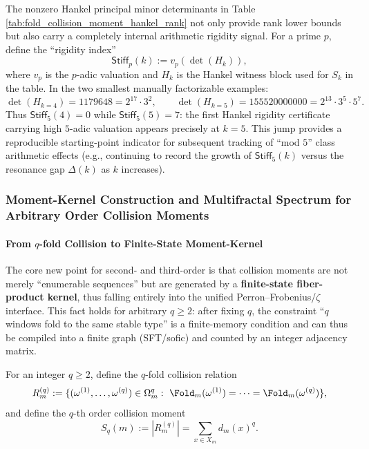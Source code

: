 \begin{remark}[\texorpdfstring{$p$}{p}-adic Rigidity Fingerprint: \texorpdfstring{$p=5$}{p=5} First Appears Explicitly in the Hankel Certificate at \texorpdfstring{$k=5$}{k=5}]\label{rem:pom-hankel-stiffness-p5}
The nonzero Hankel principal minor determinants in Table \ref{tab:fold_collision_moment_hankel_rank} not only provide rank lower bounds but also carry a completely internal arithmetic rigidity signal.
For a prime \(p\), define the ``rigidity index''
\[
\mathsf{Stiff}_p(k):=v_p(\det(H_k)),
\]
where \(v_p\) is the \(p\)-adic valuation and \(H_k\) is the Hankel witness block used for \(S_k\) in the table.
In the two smallest manually factorizable examples:
\[
\det(H_{k=4})=1179648=2^{17}\cdot 3^2,
\qquad
\det(H_{k=5})=155520000000=2^{13}\cdot 3^5\cdot 5^7.
\]
Thus \(\mathsf{Stiff}_5(4)=0\) while \(\mathsf{Stiff}_5(5)=7\): the first Hankel rigidity certificate carrying high \(5\)-adic valuation appears precisely at \(k=5\).
This jump provides a reproducible starting-point indicator for subsequent tracking of ``mod \(5\)'' class arithmetic effects (e.g., continuing to record the growth of \(\mathsf{Stiff}_5(k)\) versus the resonance gap \(\Delta(k)\) as \(k\) increases).
\end{remark}

\subsubsection{Moment-Kernel Construction and Multifractal Spectrum for Arbitrary Order Collision Moments}\label{subsec:pom-moment-general}

\paragraph{From \texorpdfstring{$q$}{q}-fold Collision to Finite-State Moment-Kernel}
The core new point for second- and third-order is that collision moments are not merely ``enumerable sequences'' but are generated by a \textbf{finite-state fiber-product kernel}, thus falling entirely into the unified Perron--Frobenius/\(\zeta\) interface.
This fact holds for arbitrary \(q\ge 2\): after fixing \(q\), the constraint ``\(q\) windows fold to the same stable type'' is a finite-memory condition and can thus be compiled into a finite graph (SFT/sofic) and counted by an integer adjacency matrix.

\begin{definition}\label{def:pom-moment-q}
For an integer \(q\ge 2\), define the \(q\)-fold collision relation
$$
R_m^{(q)}:=
\{(\omega^{(1)},\dots,\omega^{(q)})\in\Omega_m^q:\ \Fold_m(\omega^{(1)})=\cdots=\Fold_m(\omega^{(q)})\},
$$
and define the \(q\)-th order collision moment
$$
S_q(m):=|R_m^{(q)}|=\sum_{x\in X_m} d_m(x)^q.
$$
\end{definition}

